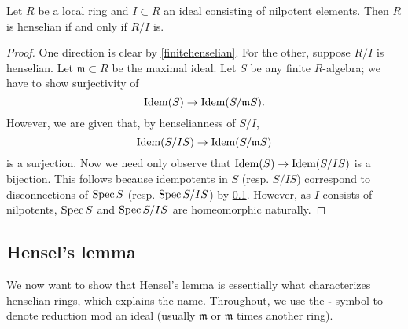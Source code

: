 \begin{proposition} 
Let $R$ be a local ring and $I \subset R$ an ideal consisting of nilpotent
elements. Then $R$ is henselian if and only if
$R/I$ is.
\end{proposition} 
\begin{proof} One direction is clear by \cref{finitehenselian}. For the other,
suppose $R/I$ is henselian. Let $\mathfrak{m} \subset R$ be the maximal ideal.
Let $S$ be any finite $R$-algebra; we have to show surjectivity of 
\[ \operatorname{\text{Idem}}(S) \to \operatorname{\text{Idem}}(S/\mathfrak{m}S).  \]
However, we are given that, by henselianness of $S/I$,
\[ \operatorname{\text{Idem}}(S/IS ) \to \operatorname{\text{Idem}}(S/\mathfrak{m}S)  \]
is a surjection. Now we need only observe that $\operatorname{\text{Idem}}(S) \to \operatorname{\text{Idem}}(S/IS)$ is a 
bijection. This follows because idempotents in $S$ (resp. $S/IS$) correspond
to disconnections of $\operatorname{Spec} S$ (resp. $\operatorname{Spec} S/IS$) by \cref{}. However, as
$I$ consists of nilpotents, $\operatorname{Spec} S$ and $\operatorname{Spec} S/IS$ are homeomorphic
naturally.
\end{proof} 

\subsection{Hensel's lemma}

We now want to show that Hensel's lemma is essentially what characterizes
henselian rings, which explains the name.
Throughout, we use the $\overline{}$ symbol to denote reduction mod an ideal
(usually $\mathfrak{m}$ or $\mathfrak{m}$ times another ring).

